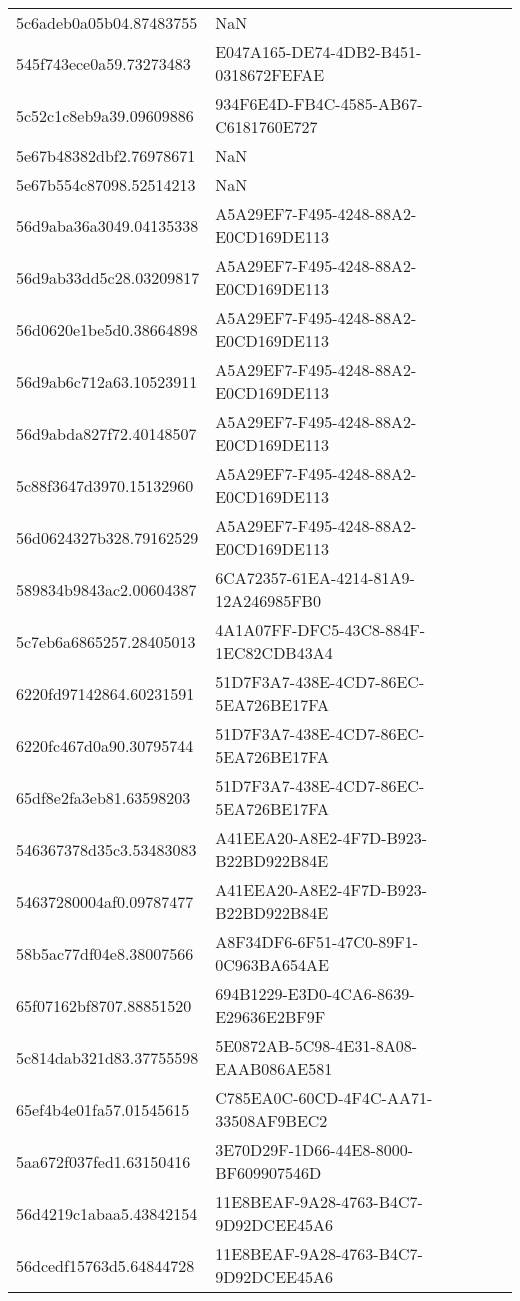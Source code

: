 \begin{tabular}{ll}
5c6adeb0a05b04.87483755 & NaN \\
545f743ece0a59.73273483 & E047A165-DE74-4DB2-B451-0318672FEFAE \\
5c52c1c8eb9a39.09609886 & 934F6E4D-FB4C-4585-AB67-C6181760E727 \\
5e67b48382dbf2.76978671 & NaN \\
5e67b554c87098.52514213 & NaN \\
56d9aba36a3049.04135338 & A5A29EF7-F495-4248-88A2-E0CD169DE113 \\
56d9ab33dd5c28.03209817 & A5A29EF7-F495-4248-88A2-E0CD169DE113 \\
56d0620e1be5d0.38664898 & A5A29EF7-F495-4248-88A2-E0CD169DE113 \\
56d9ab6c712a63.10523911 & A5A29EF7-F495-4248-88A2-E0CD169DE113 \\
56d9abda827f72.40148507 & A5A29EF7-F495-4248-88A2-E0CD169DE113 \\
5c88f3647d3970.15132960 & A5A29EF7-F495-4248-88A2-E0CD169DE113 \\
56d0624327b328.79162529 & A5A29EF7-F495-4248-88A2-E0CD169DE113 \\
589834b9843ac2.00604387 & 6CA72357-61EA-4214-81A9-12A246985FB0 \\
5c7eb6a6865257.28405013 & 4A1A07FF-DFC5-43C8-884F-1EC82CDB43A4 \\
6220fd97142864.60231591 & 51D7F3A7-438E-4CD7-86EC-5EA726BE17FA \\
6220fc467d0a90.30795744 & 51D7F3A7-438E-4CD7-86EC-5EA726BE17FA \\
65df8e2fa3eb81.63598203 & 51D7F3A7-438E-4CD7-86EC-5EA726BE17FA \\
546367378d35c3.53483083 & A41EEA20-A8E2-4F7D-B923-B22BD922B84E \\
54637280004af0.09787477 & A41EEA20-A8E2-4F7D-B923-B22BD922B84E \\
58b5ac77df04e8.38007566 & A8F34DF6-6F51-47C0-89F1-0C963BA654AE \\
65f07162bf8707.88851520 & 694B1229-E3D0-4CA6-8639-E29636E2BF9F \\
5c814dab321d83.37755598 & 5E0872AB-5C98-4E31-8A08-EAAB086AE581 \\
65ef4b4e01fa57.01545615 & C785EA0C-60CD-4F4C-AA71-33508AF9BEC2 \\
5aa672f037fed1.63150416 & 3E70D29F-1D66-44E8-8000-BF609907546D \\
56d4219c1abaa5.43842154 & 11E8BEAF-9A28-4763-B4C7-9D92DCEE45A6 \\
56dcedf15763d5.64844728 & 11E8BEAF-9A28-4763-B4C7-9D92DCEE45A6 \\

\end{tabular}
